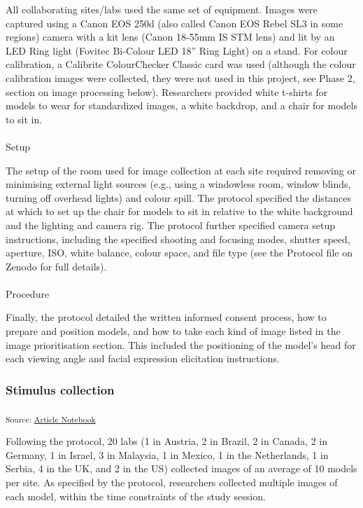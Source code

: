 \documentclass[
  letterpaper,
  DIV=11,
  numbers=noendperiod]{scrartcl}
\makeatletter
\let\oldparagraph\paragraph
\renewcommand{\paragraph}{
    \@ifstar
      \xxxParagraphStar
      \xxxParagraphNoStar
  }
\newcommand{\xxxParagraphStar}[1]{\oldparagraph*{#1}\mbox{}}
\newcommand{\xxxParagraphNoStar}[1]{\oldparagraph{#1}\mbox{}}
\makeatother
\begin{document}
All collaborating sites/labs used the same set of equipment. Images were
captured using a Canon EOS 250d (also called Canon EOS Rebel SL3 in some
regions) camera with a kit lens (Canon 18-55mm IS STM lens) and lit by
an LED Ring light (Fovitec Bi-Colour LED 18'' Ring Light) on a stand.
For colour calibration, a Calibrite ColourChecker Classic card was used
(although the colour calibration images were collected, they were not
used in this project, see Phase 2, section on image processing below).
Researchers provided white t-shirts for models to wear for standardized
images, a white backdrop, and a chair for models to sit in.

\paragraph{Setup}\label{setup}

The setup of the room used for image collection at each site required
removing or minimising external light sources (e.g., using a windowless
room, window blinds, turning off overhead lights) and colour spill. The
protocol specified the distances at which to set up the chair for models
to sit in relative to the white background and the lighting and camera
rig. The protocol further specified camera setup instructions, including
the specified shooting and focusing modes, shutter speed, aperture, ISO,
white balance, colour space, and file type (see the Protocol file on
Zenodo for full details).

\paragraph{Procedure}\label{procedure}

Finally, the protocol detailed the written informed consent process, how
to prepare and position models, and how to take each kind of image
listed in the image prioritisation section. This included the
positioning of the model's head for each viewing angle and facial
expression elicitation instructions.

\subsubsection{Stimulus collection}\label{stimulus-collection}

\textsubscript{Source:
\href{https://ManyFacesTeam.github.io/paper/index.qmd.html}{Article
Notebook}}

Following the protocol, 20 labs (1 in Austria, 2 in Brazil, 2 in Canada,
2 in Germany, 1 in Israel, 3 in Malaysia, 1 in Mexico, 1 in the
Netherlands, 1 in Serbia, 4 in the UK, and 2 in the US) collected images
of an average of 10 models per site. As specified by the protocol,
researchers collected multiple images of each model, within the time
constraints of the study session.
\end{document}
